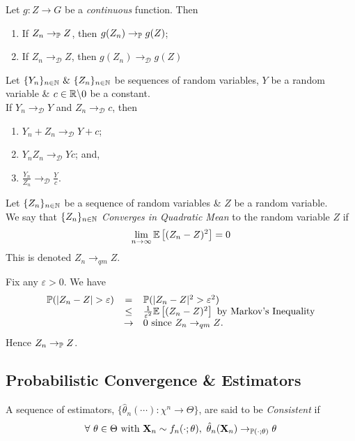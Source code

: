\documentclass[11pt,a4paper]{article}
\begin{document}
Let $g:Z\to G$ be a \textit{continuous} function. Then
\begin{enumerate}[label=\roman*)]
	\item If $Z_n\to_{\mathbb{P}} Z$, then $g(Z_n)\to_{\mathbb{P}} g(Z)$;
	\item If $Z_n\to_\mathcal{D} Z$, then $g(Z_n)\to_\mathcal{D} g(Z)$
\end{enumerate}

Let $\{Y_n\}_{n\in\nats}\ \&\ \{Z_n\}_{n\in\nats}$ be sequences of random variables, $Y$ be a random variable \& $c\in\mathbb{R}\backslash0$ be a constant.\\
If $Y_n\to_\mathcal{D}Y$ and $Z_n\to_\mathcal{D}c$, then
\begin{enumerate}[label=\roman*)]
	\item $Y_n+Z_n\to_\mathcal{D}Y+c$;
	\item $Y_nZ_n\to_\mathcal{D}Yc$; and,
	\item $\frac{Y_n}{Z_n}\to_\mathcal{D}\frac{Y}{c}$.
\end{enumerate}

Let $\{Z_n\}_{n\in\mathbb{N}}$ be a sequence of random variables \& $Z$ be a random variable.\\
We say that $\{Z_n\}_{n\in\mathbb{N}}$ \textit{Converges in Quadratic Mean} to the random variable $Z$ if
$$\lim_{n\to\infty}\mathbb{E}\left[(Z_n-Z)^2\right]=0$$
\nb This is denoted $Z_n\to_{qm}Z$.\\


Fix any $\varepsilon>0$. We have
\[\begin{array}{rcl}
\prob(|Z_n-Z|>\varepsilon)&=&\prob(|Z_n-Z|^2>\varepsilon^2)\\
&\leq&\frac{1}{\varepsilon^2}\expect\left[(Z_n-Z)^2\right]\text{ by Markov's Inequality}\\
&\to&0\text{ since $Z_n\to_{qm}Z$.}
\end{array}\]
Hence $Z_n\to_{\mathbb{P}} Z$.\proved

\subsection{Probabilistic Convergence \& Estimators}

A sequence of estimators, $\{\hat{\theta}_n(\cdots):\chi^n\to\Theta\}$, are said to be \textit{Consistent} if
$$\forall\ \theta\in\Theta\text{ with }\X_n\sim f_n(\cdot;\theta),\ \hat{\theta}_n(\X_n)\to_{\prob(\cdot;\theta)}\theta$$
\end{document}
